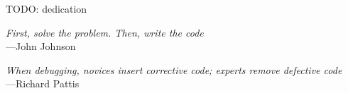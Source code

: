 %
\begin{frontmatter}

%
%
\makefrontmatter

%
%
%
%
%
%
\begin{dedication}
	TODO: dedication
\end{dedication}

%
%



%
%

\begin{epigraph}
  \emph{First, solve the problem. Then, write the code}\\
  ---John Johnson


  \emph{When debugging, novices insert corrective code; experts remove defective code}\\
  ---Richard Pattis
\end{epigraph}

%
\tableofcontents

\renewcommand{\glossarysection}[2][]{
\newpage
\noindent
\centerline{LIST OF ABBREVIATIONS}
}


\end{frontmatter}
